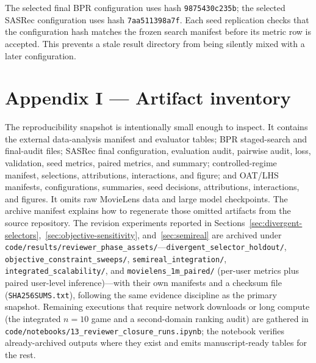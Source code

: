 \documentclass[pdflatex,sn-mathphys-num]{sn-jnl}
\theoremstyle{thmstyleone}
\theoremstyle{thmstyletwo}
\theoremstyle{thmstylethree}
\begin{document}
\begin{appendices}
The selected final BPR configuration uses hash \texttt{9875430c235b}; the selected SASRec configuration uses hash \texttt{7aa511398a7f}. Each seed replication checks that the configuration hash matches the frozen search manifest before its metric row is accepted. This prevents a stale result directory from being silently mixed with a later configuration.

\section*{Appendix I --- Artifact inventory}\label{app:artifacts}
The reproducibility snapshot is intentionally small enough to inspect. It contains the external data-analysis manifest and evaluator tables; BPR staged-search and final-audit files; SASRec final configuration, evaluation audit, pairwise audit, loss, validation, seed metrics, paired metrics, and summary; controlled-regime manifest, selections, attributions, interactions, and figure; and OAT/LHS manifests, configurations, summaries, seed decisions, attributions, interactions, and figures. It omits raw MovieLens data and large model checkpoints. The archive manifest explains how to regenerate those omitted artifacts from the source repository. The revision experiments reported in Sections~\ref{sec:divergent-selectors},~\ref{sec:objective-sensitivity}, and~\ref{sec:semireal} are archived under \texttt{code/results/reviewer\_phase\_assets/}---\texttt{divergent\_selector\_holdout/}, \texttt{objective\_constraint\_sweeps/}, \texttt{semireal\_integration/}, \texttt{integrated\_scalability/}, and \texttt{movielens\_1m\_paired/} (per-user metrics plus paired user-level inference)---with their own manifests and a checksum file (\texttt{SHA256SUMS.txt}), following the same evidence discipline as the primary snapshot. Remaining executions that require network downloads or long compute (the integrated $n=10$ game and a second-domain ranking audit) are gathered in \texttt{code/notebooks/13\_reviewer\_closure\_runs.ipynb}; the notebook verifies already-archived outputs where they exist and emits manuscript-ready tables for the rest.

\end{appendices}


\end{document}
